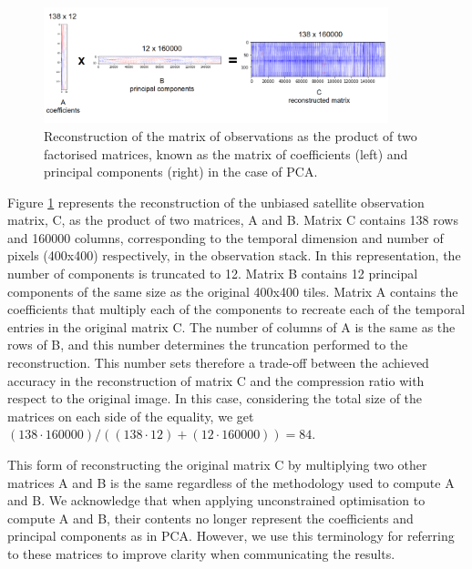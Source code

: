 \documentclass[essd, manuscript]{copernicus}
\begin{document}
\begin{figure}%
    \includegraphics[width=10cm]{fig3.png}
	\caption{Reconstruction of the matrix of observations as the product of two factorised matrices, known as the matrix of coefficients (left) and principal components (right) in the case of PCA.}%
    \label{factorisation}%
\end{figure}

Figure \ref{factorisation} represents the reconstruction of the unbiased satellite observation matrix, C, as the product of two matrices, A and B. Matrix C contains 138 rows and 160000 columns, corresponding to the temporal dimension and number of pixels (400x400) respectively, in the observation stack. In this representation, the number of components is truncated to 12. Matrix B contains 12 principal components of the same size as the original 400x400 tiles. Matrix A contains the coefficients that multiply each of the components to recreate each of the temporal entries in the original matrix C. The number of columns of A is the same as the rows of B, and this number determines the truncation performed to the reconstruction. This number sets therefore a trade-off between the achieved accuracy in the reconstruction of matrix C and the compression ratio with respect to the original image. In this case, considering the total size of the matrices on each side of the equality, we get $(138 \cdot 160000) / ((138 \cdot 12) + (12 \cdot 160000)) = 84 $. 

This form of reconstructing the original matrix C by multiplying two other matrices A and B is the same regardless of the methodology used to compute A and B. We acknowledge that when applying unconstrained optimisation to compute A and B, their contents no longer represent the coefficients and principal components as in PCA. However, we use this terminology for referring to these matrices to improve clarity when communicating the results.
\end{document}
